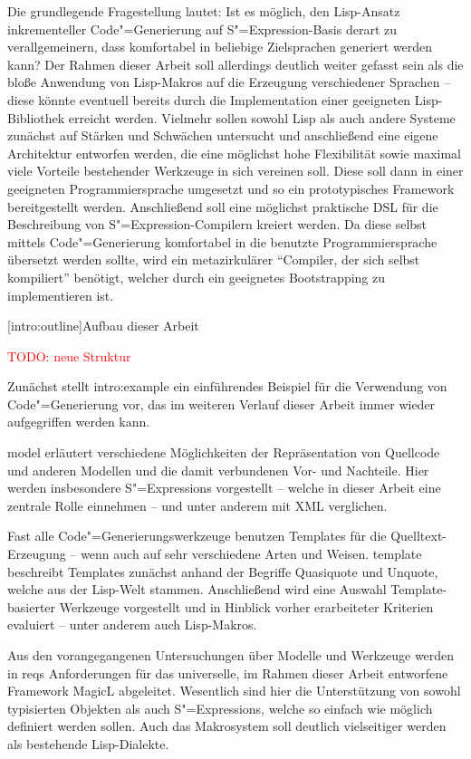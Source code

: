 \documentclass[11pt, a4paper, bibgerm]{scrbook}
\newcommand{\todo}[1]{
  \textcolor{red}{TODO: #1}
}
\newcommand\lsection{}
\newcommand\cref{}
\newcommand\sref{}
\newcommand{\sexp}{S"=Expression}
\newcommand{\sexps}{S"=Expressions}
\newcommand{\cgen}{Code"=Generierung}
\begin{document}
Die grundlegende Fragestellung lautet: Ist es möglich, den Lisp-Ansatz
inkrementeller \cgen{} auf \sexp{}-Basis derart zu verallgemeinern, dass
komfortabel in beliebige Zielsprachen generiert werden kann? Der Rahmen
dieser Arbeit soll allerdings deutlich weiter gefasst sein als die bloße
Anwendung von Lisp-Makros auf die Erzeugung verschiedener Sprachen --
diese könnte eventuell bereits durch die Implementation einer geeigneten
Lisp-Bibliothek erreicht werden. Vielmehr sollen sowohl Lisp als auch
andere Systeme zunächst auf Stärken und Schwächen untersucht und
anschließend eine eigene Architektur entworfen werden, die eine
möglichst hohe Flexibilität sowie maximal viele Vorteile bestehender
Werkzeuge in sich vereinen soll. Diese soll dann in einer geeigneten
Programmiersprache umgesetzt und so ein prototypisches Framework
bereitgestellt werden. Anschließend soll eine möglichst praktische DSL
für die Beschreibung von \sexp{}-Compilern kreiert werden. Da diese
selbst mittels \cgen{} komfortabel in die benutzte Programmiersprache
übersetzt werden sollte, wird ein metazirkulärer "`Compiler, der sich
selbst kompiliert"' benötigt, welcher durch ein geeignetes Bootstrapping
zu implementieren ist.

\lsection[intro:outline]{Aufbau dieser Arbeit}

\todo{neue Struktur}

Zunächst stellt \sref{intro:example} ein einführendes Beispiel für die
Verwendung von \cgen{} vor, das im weiteren Verlauf dieser Arbeit immer
wieder aufgegriffen werden kann.

\cref{model} erläutert verschiedene Möglichkeiten der Repräsentation von
Quellcode und anderen Modellen und die damit verbundenen Vor- und
Nachteile. Hier werden insbesondere \sexps{} vorgestellt -- welche in
dieser Arbeit eine zentrale Rolle einnehmen -- und unter anderem mit XML
verglichen.

Fast alle \cgen{}swerkzeuge benutzen Templates für die
Quelltext-Erzeugung -- wenn auch auf sehr verschiedene Arten und
Weisen. \cref{template} beschreibt Templates zunächst anhand der
Begriffe Quasiquote und Unquote, welche aus der Lisp-Welt
stammen. Anschließend wird eine Auswahl Template-basierter Werkzeuge
vorgestellt und in Hinblick vorher erarbeiteter Kriterien evaluiert --
unter anderem auch Lisp-Makros.

Aus den vorangegangenen Untersuchungen über Modelle und Werkzeuge werden
in \cref{reqs} Anforderungen für das universelle, im Rahmen dieser
Arbeit entworfene Framework MagicL abgeleitet. Wesentlich sind hier die
Unterstützung von sowohl typisierten Objekten als auch \sexps{}, welche
so einfach wie möglich definiert werden sollen. Auch das Makrosystem
soll deutlich vielseitiger werden als bestehende Lisp-Dialekte.
\end{document}
